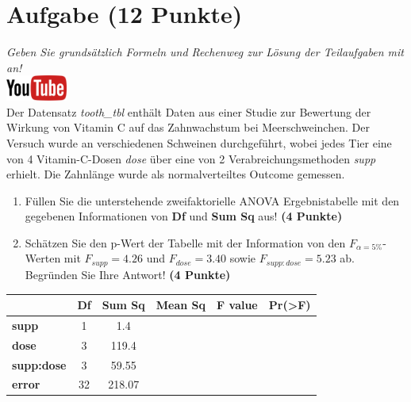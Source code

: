 \documentclass[a4paper, 9pt]{scrartcl}\usepackage[]{graphicx}\usepackage[]{xcolor}
\begin{document}
 
\clearpage

\section{Aufgabe \hfill (12 Punkte)}

\textit{Geben Sie grunds{\"a}tzlich Formeln und Rechenweg zur L{\"o}sung der
  Teilaufgaben mit an!} \\[1Ex]

\hfill\href{https://youtu.be/8Pb2sKUIMyk}{\includegraphics[width =
  2cm]{img/youtube}}\\[1Ex]



Der Datensatz \textit{tooth\_tbl} enth{\"a}lt Daten aus einer Studie zur
Bewertung der Wirkung von Vitamin C auf das Zahnwachstum bei
Meerschweinchen. Der Versuch wurde an verschiedenen Schweinen durchgef{\"u}hrt,
wobei jedes Tier eine von 4 Vitamin-C-Dosen \textit{dose}
{\"u}ber eine von 2 Verabreichungsmethoden \textit{supp}
erhielt. Die Zahnl{\"a}nge wurde als normalverteiltes Outcome gemessen.



\begin{enumerate}
\item F{\"u}llen Sie die unterstehende zweifaktorielle ANOVA Ergebnistabelle 
  mit den gegebenen Informationen von \textbf{Df} und \textbf{Sum Sq} aus!
  \textbf{(4 Punkte)}
\item Sch{\"a}tzen Sie den p-Wert der Tabelle mit der Information von den
  $F_{\alpha = 5\%}$-Werten mit
  $F_{supp} = 4.26$ und
  $F_{dose} = 3.40$ sowie
  $F_{supp:dose} = 5.23$ ab. Begr{\"u}nden Sie Ihre
  Antwort! \textbf{(4 Punkte)}
\end{enumerate}

\vspace{1Ex}

\begin{center}
  \Large
  \begin{tabular}{l|c|c|c|c|c}
     & \textbf{Df} & \textbf{Sum Sq} & \textbf{Mean Sq} & \textbf{F value} & \textbf{Pr(>F)} \strut\\
    \hline
   \textbf{supp}  & 1 & 1.4 &  &  &  \strut\\
    \hline
    \textbf{dose}  & 3 & 119.4 &  &  &  \strut\\
    \hline
    \textbf{supp:dose}  & 3 & 59.55 &  &  &  \strut\\
    \hline
   \textbf{error}  & 32 & 218.07 &  &  &  \strut\\
  \end{tabular}
\end{center}
\end{document}
